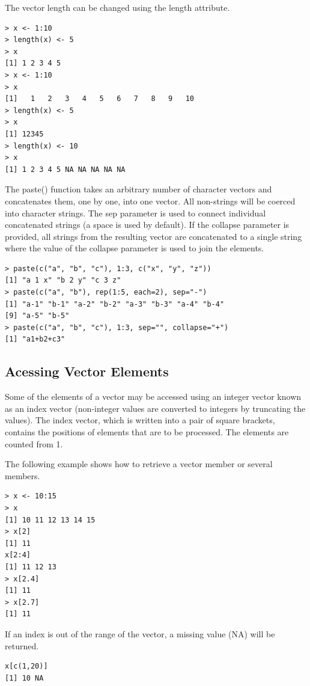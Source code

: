 \documentclass[11pt,openany,executivepaper]{book}
\begin{document}
The vector length can be changed using the length attribute.

\begin{verbatim}
> x <- 1:10
> length(x) <- 5
> x
[1] 1 2 3 4 5
> x <- 1:10
> x
[1]   1   2   3   4   5   6   7   8   9   10
> length(x) <- 5
> x
[1] 12345
> length(x) <- 10
> x
[1] 1 2 3 4 5 NA NA NA NA NA
\end{verbatim}

The paste() function takes an arbitrary number of character vectors and concatenates them, one by one, into one vector. All non-strings will be coerced\\
into character strings. The sep parameter is used to connect individual concatenated strings (a space is used by default). If the collapse parameter is provided, all strings from the resulting vector are concatenated to a single string where the value of the collapse parameter is used to join the elements.

\begin{verbatim}
> paste(c("a", "b", "c"), 1:3, c("x", "y", "z"))
[1] "a 1 x" "b 2 y" "c 3 z"
> paste(c("a", "b"), rep(1:5, each=2), sep="-")
[1] "a-1" "b-1" "a-2" "b-2" "a-3" "b-3" "a-4" "b-4"
[9] "a-5" "b-5"
> paste(c("a", "b", "c"), 1:3, sep="", collapse="+")
[1] "a1+b2+c3"
\end{verbatim}

\subsection{Acessing Vector Elements}
Some of the elements of a vector may be accessed using an integer vector known as an index vector (non-integer values are converted to integers by truncating the values). The index vector, which is written into a pair of square brackets, contains the positions of elements that are to be processed. The elements are counted from 1.

The following example shows how to retrieve a vector member or several members.

\begin{verbatim}
> x <- 10:15
> x
[1] 10 11 12 13 14 15
> x[2]
[1] 11
x[2:4]
[1] 11 12 13
> x[2.4]
[1] 11
> x[2.7]
[1] 11
\end{verbatim}

If an index is out of the range of the vector, a missing value (NA) will be returned.

\begin{verbatim}  
x[c(1,20)]
[1] 10 NA
\end{verbatim}
\end{document}
